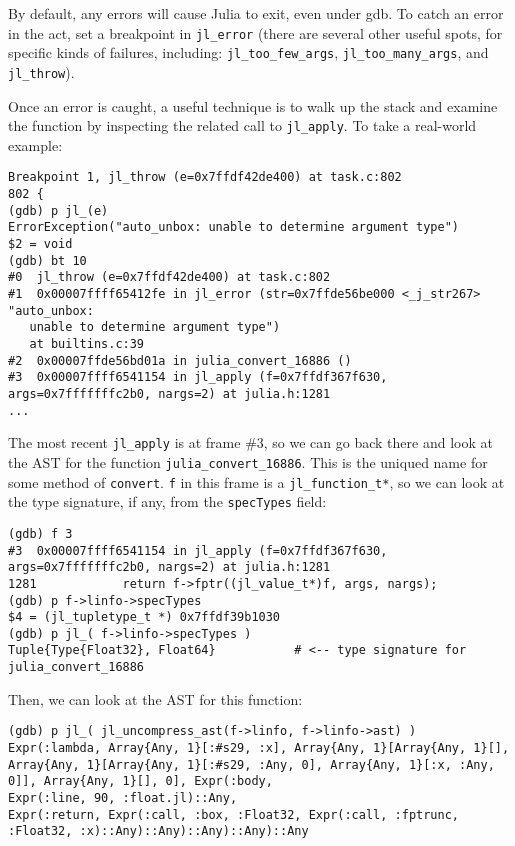 By default, any errors will cause Julia to exit, even under gdb. To catch an error {\textquotedbl}in the act{\textquotedbl}, set a breakpoint in \texttt{jl\_error} (there are several other useful spots, for specific kinds of failures, including: \texttt{jl\_too\_few\_args}, \texttt{jl\_too\_many\_args}, and \texttt{jl\_throw}).



Once an error is caught, a useful technique is to walk up the stack and examine the function by inspecting the related call to \texttt{jl\_apply}. To take a real-world example:




\begin{lstlisting}
Breakpoint 1, jl_throw (e=0x7ffdf42de400) at task.c:802
802 {
(gdb) p jl_(e)
ErrorException("auto_unbox: unable to determine argument type")
$2 = void
(gdb) bt 10
#0  jl_throw (e=0x7ffdf42de400) at task.c:802
#1  0x00007ffff65412fe in jl_error (str=0x7ffde56be000 <_j_str267> "auto_unbox:
   unable to determine argument type")
   at builtins.c:39
#2  0x00007ffde56bd01a in julia_convert_16886 ()
#3  0x00007ffff6541154 in jl_apply (f=0x7ffdf367f630, args=0x7fffffffc2b0, nargs=2) at julia.h:1281
...
\end{lstlisting}



The most recent \texttt{jl\_apply} is at frame \#3, so we can go back there and look at the AST for the function \texttt{julia\_convert\_16886}. This is the uniqued name for some method of \texttt{convert}. \texttt{f} in this frame is a \texttt{jl\_function\_t*}, so we can look at the type signature, if any, from the \texttt{specTypes} field:




\begin{lstlisting}
(gdb) f 3
#3  0x00007ffff6541154 in jl_apply (f=0x7ffdf367f630, args=0x7fffffffc2b0, nargs=2) at julia.h:1281
1281            return f->fptr((jl_value_t*)f, args, nargs);
(gdb) p f->linfo->specTypes
$4 = (jl_tupletype_t *) 0x7ffdf39b1030
(gdb) p jl_( f->linfo->specTypes )
Tuple{Type{Float32}, Float64}           # <-- type signature for julia_convert_16886
\end{lstlisting}



Then, we can look at the AST for this function:




\begin{lstlisting}
(gdb) p jl_( jl_uncompress_ast(f->linfo, f->linfo->ast) )
Expr(:lambda, Array{Any, 1}[:#s29, :x], Array{Any, 1}[Array{Any, 1}[], Array{Any, 1}[Array{Any, 1}[:#s29, :Any, 0], Array{Any, 1}[:x, :Any, 0]], Array{Any, 1}[], 0], Expr(:body,
Expr(:line, 90, :float.jl)::Any,
Expr(:return, Expr(:call, :box, :Float32, Expr(:call, :fptrunc, :Float32, :x)::Any)::Any)::Any)::Any)::Any
\end{lstlisting}



